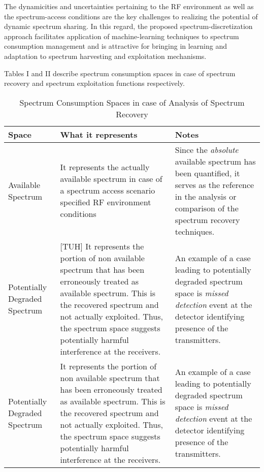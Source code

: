 \documentclass[journal,12pt,draftclsnofoot,onecolumn]{IEEEtran}
\newcommand{\mycomment}[1]{}
\begin{document}
The dynamicities and uncertainties pertaining to the RF environment as well as the spectrum-access conditions are the key challenges to realizing the potential of dynamic spectrum sharing. In this regard, the proposed spectrum-discretization approach facilitates application of machine-learning techniques to spectrum consumption management and is attractive for bringing in learning and adaptation to spectrum harvesting and exploitation mechanisms.  

Tables I and II \mycomment{\ref{table:SHSCS} and \ref{table:SXSCS}} describe spectrum consumption spaces in case of spectrum recovery and spectrum exploitation functions respectively. 

\begin{table}[h!b!p!]
\label{table:SHSCS}
\caption{Spectrum Consumption Spaces in case of Analysis of Spectrum Recovery}
\centering
\begin{tabular}{lp{5cm}p{5cm}}
\hline
Space & What it represents & Notes\\
\hline
Available Spectrum  & It represents the actually available spectrum in case of a spectrum access scenario specified RF environment conditions & Since the \textit{absolute} available spectrum has been quantified, it serves as the reference in the analysis or comparison of the spectrum recovery techniques.\\
Potentially Degraded Spectrum & [TUH] It represents the portion of non available spectrum that has been erroneously treated as available spectrum. This is the recovered spectrum and not actually exploited. Thus, the spectrum space suggests potentially harmful interference at the receivers.& An example of a case leading to potentially degraded spectrum space is \textit{missed detection} event at the detector identifying presence of the transmitters.\\
Potentially Degraded Spectrum & It represents the portion of non available spectrum that has been erroneously treated as available spectrum. This is the recovered spectrum and not actually exploited. Thus, the spectrum space suggests potentially harmful interference at the receivers.& An example of a case leading to potentially degraded spectrum space is \textit{missed detection} event at the detector identifying presence of the transmitters.\\
\hline
\end{tabular}
\end{table}
\end{document}

